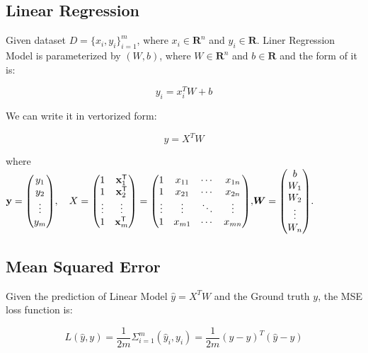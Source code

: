 \documentclass[journal, a4paper]{IEEEtran}
\begin{document}
\subsection{Linear Regression}
Given dataset $ D=\{x_{i}, y_{i}\}_{i=1}^{m}$, where $x_{i} \in \mathbf{R}^{n}$ and $y_{i} \in \mathbf{R}$.
Liner Regression Model is parameterized by $(W, b)$, where $W \in \mathbf{R}^{n}$ and $b \in \mathbf{R}$ and the form of it is:
 \begin{center}
 	\begin{equation}
 	y_{i} = x_{i}^{T}W + b
 	\end{equation}
 \end{center} 
We can write it in vertorized form:
 \begin{center}
	\begin{equation}
	y = X^{T}W
	\end{equation}
\end{center} 
where \\
$\mathbf {y} ={\begin{pmatrix}y_{1}\\y_{2}\\\vdots \\y_{m}\end{pmatrix}},\quad 
{\displaystyle X={\begin{pmatrix}1&\mathbf{x} _{1}^{\mathsf {T}}\\1&\mathbf {x} _{2}^{\mathsf {T}}\\\vdots&\vdots \\1&\mathbf {x} _{m}^{\mathsf {T}}\end{pmatrix}}={\begin{pmatrix}1&x_{11}&\cdots &x_{1n}\\1&x_{21}&\cdots &x_{2n}\\\vdots &\vdots &\ddots &\vdots \\1&x_{m1}&\cdots &x_{mn}\end{pmatrix}},} \\
{\displaystyle {\boldsymbol {W }}={\begin{pmatrix}b \\W_{1}\\W_{2}\\\vdots \\W_{n}\end{pmatrix}}.}$
\subsection{Mean Squared Error}
Given the prediction of Linear Model $\hat{y} = X^{T}W $ and the Ground truth $y$, the MSE loss function is:
 \begin{center}
	\begin{equation}
	L(\hat{y}, y) = \frac{1}{2m} \Sigma_{i=1}^{m}(\hat{y}_i, y_i) 
				= \frac{1}{2m}(\hat{y} - y)^{T}(\hat{y} - y)
	\end{equation}
\end{center} 
\end{document}
